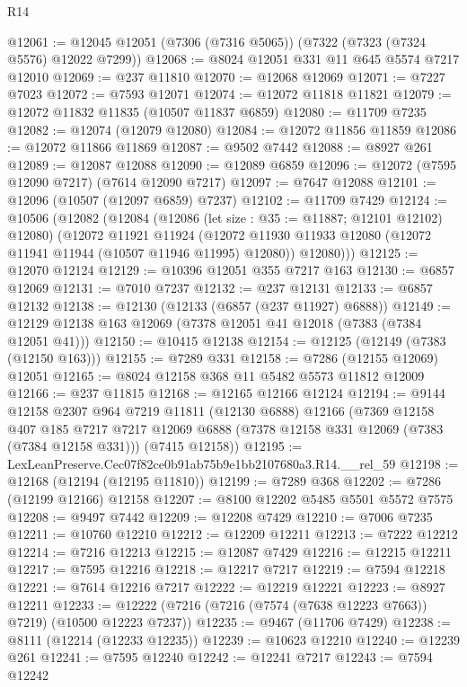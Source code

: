 \begin{lexlean}{R14}
\begin{coremodule}
@12061 := @12045 @12051 (@7306 (@7316 @5065)) (@7322 (@7323 (@7324 @5576) @12022 @7299))
@12068 := @8024 @12051 @331 @11 @645 @5574 @7217 @12010
@12069 := @237 @11810
@12070 := @12068 @12069
@12071 := @7227 @7023
@12072 := @7593 @12071
@12074 := @12072 @11818 @11821
@12079 := @12072 @11832 @11835 (@10507 @11837 @6859)
@12080 := @11709 @7235
@12082 := @12074 (@12079 @12080)
@12084 := @12072 @11856 @11859
@12086 := @12072 @11866 @11869
@12087 := @9502 @7442
@12088 := @8927 @261
@12089 := @12087 @12088
@12090 := @12089 @6859
@12096 := @12072 (@7595 @12090 @7217) (@7614 @12090 @7217)
@12097 := @7647 @12088
@12101 := @12096 (@10507 (@12097 @6859) @7237)
@12102 := @11709 @7429
@12124 := @10506
    (@12082
      (@12084
        (@12086 (let size : @35 := @11887; @12101 @12102) @12080)
        (@12072
          @11921
          @11924
          (@12072 @11930 @11933 @12080 (@12072 @11941 @11944 (@10507 @11946 @11995) @12080))
          @12080)))
@12125 := @12070 @12124
@12129 := @10396 @12051 @355 @7217 @163
@12130 := @6857 @12069
@12131 := @7010 @7237
@12132 := @237 @12131
@12133 := @6857 @12132
@12138 := @12130 (@12133 (@6857 (@237 @11927) @6888))
@12149 := @12129 @12138 @163 @12069 (@7378 @12051 @41 @12018 (@7383 (@7384 @12051 @41)))
@12150 := @10415 @12138
@12154 := @12125 (@12149 (@7383 (@12150 @163)))
@12155 := @7289 @331
@12158 := @7286 (@12155 @12069) @12051
@12165 := @8024 @12158 @368 @11 @5482 @5573 @11812 @12009
@12166 := @237 @11815
@12168 := @12165 @12166 @12124
@12194 := @9144
    @12158
    @2307
    @964
    @7219
    @11811
    (@12130 @6888)
    @12166
    (@7369
      @12158
      @407
      @185
      @7217
      @7217
      @12069
      @6888
      (@7378 @12158 @331 @12069 (@7383 (@7384 @12158 @331)))
      (@7415 @12158))
@12195 := LexLeanPreserve.Cec07f82ce0b91ab75b9e1bb2107680a3.R14.__rel_59
@12198 := @12168 (@12194 (@12195 @11810))
@12199 := @7289 @368
@12202 := @7286 (@12199 @12166) @12158
@12207 := @8100 @12202 @5485 @5501 @5572 @7575
@12208 := @9497 @7442
@12209 := @12208 @7429
@12210 := @7006 @7235
@12211 := @10760 @12210
@12212 := @12209 @12211
@12213 := @7222 @12212
@12214 := @7216 @12213
@12215 := @12087 @7429
@12216 := @12215 @12211
@12217 := @7595 @12216
@12218 := @12217 @7217
@12219 := @7594 @12218
@12221 := @7614 @12216 @7217
@12222 := @12219 @12221
@12223 := @8927 @12211
@12233 := @12222 (@7216 (@7216 (@7574 (@7638 @12223 @7663)) @7219) (@10500 @12223 @7237))
@12235 := @9467 (@11706 @7429)
@12238 := @8111 (@12214 (@12233 @12235))
@12239 := @10623 @12210
@12240 := @12239 @261
@12241 := @7595 @12240
@12242 := @12241 @7217
@12243 := @7594 @12242

\end{coremodule}
\end{lexlean}
